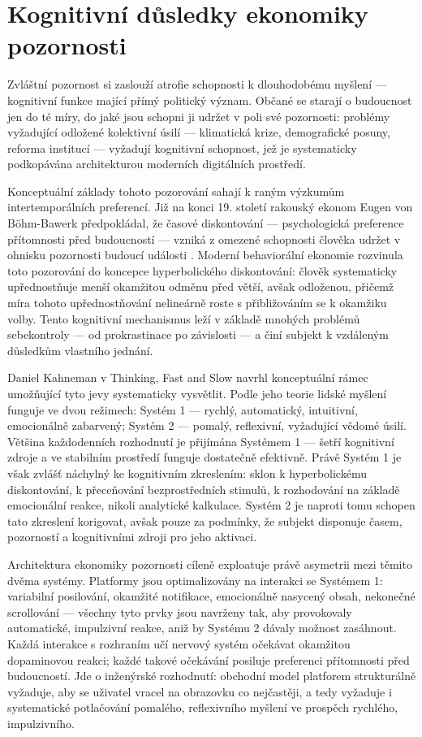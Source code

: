 \section{Kognitivní důsledky ekonomiky pozornosti}
Zvláštní pozornost si zaslouží atrofie schopnosti k dlouhodobému myšlení — kognitivní funkce mající přímý politický význam. Občané se starají o budoucnost jen do té míry, do jaké jsou schopni ji udržet v poli své pozornosti: problémy vyžadující odložené kolektivní úsilí — klimatická krize, demografické posuny, reforma institucí — vyžadují kognitivní schopnost, jež je systematicky podkopávána architekturou moderních digitálních prostředí.

Konceptuální základy tohoto pozorování sahají k raným výzkumům intertemporálních preferencí. Již na konci 19. století rakouský ekonom Eugen von Böhm-Bawerk předpokládal, že časové diskontování — psychologická preference přítomnosti před budoucností — vzniká z omezené schopnosti člověka udržet v ohnisku pozornosti budoucí události \parencite{BohmBawerk89}. Moderní behaviorální ekonomie rozvinula toto pozorování do koncepce hyperbolického diskontování: člověk systematicky upřednostňuje menší okamžitou odměnu před větší, avšak odloženou, přičemž míra tohoto upřednostňování nelineárně roste s přibližováním se k okamžiku volby. Tento kognitivní mechanismus leží v základě mnohých problémů sebekontroly — od prokrastinace po závislosti — a činí subjekt  k vzdáleným důsledkům vlastního jednání.

Daniel Kahneman v Thinking, Fast and Slow \parencite{Kahneman11} navrhl konceptuální rámec umožňující tyto jevy systematicky vysvětlit. Podle jeho teorie lidské myšlení funguje ve dvou režimech: Systém 1 — rychlý, automatický, intuitivní, emocionálně zabarvený; Systém 2 — pomalý, reflexivní, vyžadující vědomé úsilí. Většina každodenních rozhodnutí je přijímána Systémem 1 — šetří kognitivní zdroje a ve stabilním prostředí funguje dostatečně efektivně. Právě Systém 1 je však zvlášť náchylný ke kognitivním zkreslením: sklon k hyperbolickému diskontování, k přeceňování bezprostředních stimulů, k rozhodování na základě emocionální reakce, nikoli analytické kalkulace. Systém 2 je naproti tomu schopen tato zkreslení korigovat, avšak pouze za podmínky, že subjekt disponuje časem, pozorností a kognitivními zdroji pro jeho aktivaci.

Architektura ekonomiky pozornosti cíleně exploatuje právě asymetrii mezi těmito dvěma systémy. Platformy jsou optimalizovány na interakci se Systémem 1: variabilní posilování, okamžité notifikace, emocionálně nasycený obsah, nekonečné scrollování — všechny tyto prvky jsou navrženy tak, aby provokovaly automatické, impulzivní reakce, aniž by Systému 2 dávaly možnost zasáhnout. Každá interakce s rozhraním učí nervový systém očekávat okamžitou dopaminovou reakci; každé takové očekávání posiluje preferenci přítomnosti před budoucností. Jde o inženýrské rozhodnutí: obchodní model platforem strukturálně vyžaduje, aby se uživatel vracel na obrazovku co nejčastěji, a tedy vyžaduje i systematické potlačování pomalého, reflexivního myšlení ve prospěch rychlého, impulzivního.


